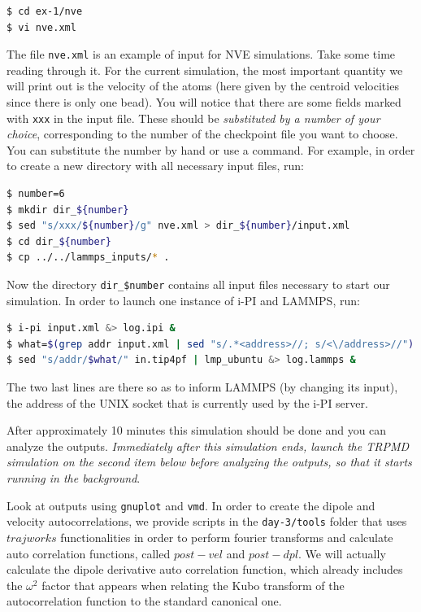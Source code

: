 \documentclass{article}
\begin{document}
\begin{Exercise}[label={realtime},title={Velocity and dipole real time correlation functions}]
\begin{itemize}
\begin{lstlisting}[language=Bash,emph={\$}]
$ cd ex-1/nve
$ vi nve.xml
\end{lstlisting}

   The file \texttt{nve.xml} is an example of input for NVE simulations. Take some time reading through it. For the current simulation, the most important quantity we will print out is the velocity of the atoms (here given by the centroid velocities since there is only one bead). You will notice that there are some fields marked with \texttt{xxx} in the input file. These should be {\it substituted by a number of your choice}, corresponding to the number of the checkpoint file you want to choose. You can substitute the number by hand or use a command. For example, in order to create a new directory with all necessary input files, run:

\begin{lstlisting}[language=Bash,emph={\$}]
$ number=6
$ mkdir dir_${number} 
$ sed "s/xxx/${number}/g" nve.xml > dir_${number}/input.xml
$ cd dir_${number}
$ cp ../../lammps_inputs/* .

\end{lstlisting}

Now the directory \texttt{dir\_\$number} contains all input files necessary to start our simulation. In order to launch one instance of i-PI and LAMMPS, run:

\begin{lstlisting}[language=Bash,emph={\$}]
$ i-pi input.xml &> log.ipi &
$ what=$(grep addr input.xml | sed "s/.*<address>//; s/<\/address>//")
$ sed "s/addr/$what/" in.tip4pf | lmp_ubuntu &> log.lammps &

\end{lstlisting}

The two last lines are there so as to inform LAMMPS (by changing its input), the address of the UNIX socket that is currently used by the i-PI server.

After approximately 10 minutes this simulation should be done and you can analyze the outputs. {\it Immediately after this simulation ends, launch the TRPMD simulation on the second item below before analyzing the outputs, so that it starts running in the background}.

Look at outputs using \texttt{gnuplot} and \texttt{vmd}. In order to create the dipole and velocity autocorrelations, we provide scripts in the \texttt{day-3/tools} folder that uses \lstinbash$trajworks$ functionalities in order to perform fourier transforms and calculate auto correlation functions, called \lstinbash$post-vel$ and \lstinbash$post-dpl$. We will actually calculate the dipole derivative auto correlation function, which already includes the $\omega^2$ factor that appears when relating the Kubo transform of the autocorrelation function to the standard canonical one.


\end{itemize}
\end{Exercise}
\end{document}
